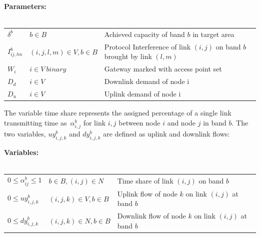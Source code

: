 \noindent
{\bf Parameters:}\\
\\
\begin{tabular}{llp{3.4cm}}
$\delta^b$ & $b \in B$ & Achieved capacity of band $b$ in target area\\
$I_{ij,lm}^b$ & $(i,j,l,m) \in V, b\in B $ & Protocol Interference of link $(i,j)$ on band $b$ brought by link $(l,m)$\\
$W_i$ & $i \in V\ binary$ & Gateway marked with access point set\\
$D_{d}$ & $i \in V\ $ & Downlink demand of node i\\
$D_{u}$ & $i \in V\ $ & Uplink demand of node i\\
\end{tabular}

The variable time share represents the assigned percentage of a single link transmitting time as~$\alpha_{i,j}^b$ 
for link $i,j$ between node $i$ and node $j$ in band $b$. The two variables, $uy_{i,j,k}^{b}$ and $dy_{i,j,k}^{b}$ 
are defined as uplink and downlink flows:

\noindent
{\bf Variables:}\\
\\
\begin{tabular}{llp{3cm}}
$0\le \alpha_{ij}^b \le 1$  & $b\in B, (i,j) \in N$ & 
Time share of link $(i,j)$ on band $b$\\ 
$0\le uy_{i,j,k}^b$ & $(i,j,k) \in V, b \in B$ & 
Uplink flow of node $k$ on link $(i,j)$ at band $b$ \\ 
$0\le dy_{i,j,k}^b$ & $(i,j,k) \in N, b \in B$ & 
Downlink flow of node $k$ on link $(i,j)$ at band $b$ \\ 
\end{tabular}
\vspace{1pt}

